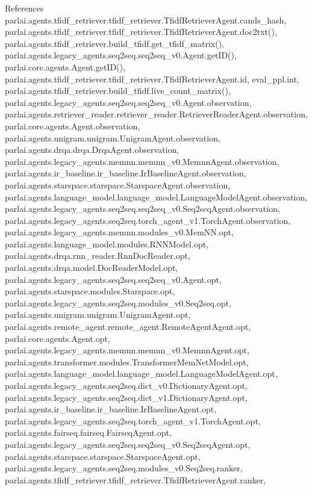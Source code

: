 References parlai.\+agents.\+tfidf\+\_\+retriever.\+tfidf\+\_\+retriever.\+Tfidf\+Retriever\+Agent.\+cands\+\_\+hash, parlai.\+agents.\+tfidf\+\_\+retriever.\+tfidf\+\_\+retriever.\+Tfidf\+Retriever\+Agent.\+doc2txt(), parlai.\+agents.\+tfidf\+\_\+retriever.\+build\+\_\+tfidf.\+get\+\_\+tfidf\+\_\+matrix(), parlai.\+agents.\+legacy\+\_\+agents.\+seq2seq.\+seq2seq\+\_\+v0.\+Agent.\+get\+I\+D(), parlai.\+core.\+agents.\+Agent.\+get\+I\+D(), parlai.\+agents.\+tfidf\+\_\+retriever.\+tfidf\+\_\+retriever.\+Tfidf\+Retriever\+Agent.\+id, eval\+\_\+ppl.\+int, parlai.\+agents.\+tfidf\+\_\+retriever.\+build\+\_\+tfidf.\+live\+\_\+count\+\_\+matrix(), parlai.\+agents.\+legacy\+\_\+agents.\+seq2seq.\+seq2seq\+\_\+v0.\+Agent.\+observation, parlai.\+agents.\+retriever\+\_\+reader.\+retriever\+\_\+reader.\+Retriever\+Reader\+Agent.\+observation, parlai.\+core.\+agents.\+Agent.\+observation, parlai.\+agents.\+unigram.\+unigram.\+Unigram\+Agent.\+observation, parlai.\+agents.\+drqa.\+drqa.\+Drqa\+Agent.\+observation, parlai.\+agents.\+legacy\+\_\+agents.\+memnn.\+memnn\+\_\+v0.\+Memnn\+Agent.\+observation, parlai.\+agents.\+ir\+\_\+baseline.\+ir\+\_\+baseline.\+Ir\+Baseline\+Agent.\+observation, parlai.\+agents.\+starspace.\+starspace.\+Starspace\+Agent.\+observation, parlai.\+agents.\+language\+\_\+model.\+language\+\_\+model.\+Language\+Model\+Agent.\+observation, parlai.\+agents.\+legacy\+\_\+agents.\+seq2seq.\+seq2seq\+\_\+v0.\+Seq2seq\+Agent.\+observation, parlai.\+agents.\+legacy\+\_\+agents.\+seq2seq.\+torch\+\_\+agent\+\_\+v1.\+Torch\+Agent.\+observation, parlai.\+agents.\+legacy\+\_\+agents.\+memnn.\+modules\+\_\+v0.\+Mem\+N\+N.\+opt, parlai.\+agents.\+language\+\_\+model.\+modules.\+R\+N\+N\+Model.\+opt, parlai.\+agents.\+drqa.\+rnn\+\_\+reader.\+Rnn\+Doc\+Reader.\+opt, parlai.\+agents.\+drqa.\+model.\+Doc\+Reader\+Model.\+opt, parlai.\+agents.\+legacy\+\_\+agents.\+seq2seq.\+seq2seq\+\_\+v0.\+Agent.\+opt, parlai.\+agents.\+starspace.\+modules.\+Starspace.\+opt, parlai.\+agents.\+legacy\+\_\+agents.\+seq2seq.\+modules\+\_\+v0.\+Seq2seq.\+opt, parlai.\+agents.\+unigram.\+unigram.\+Unigram\+Agent.\+opt, parlai.\+agents.\+remote\+\_\+agent.\+remote\+\_\+agent.\+Remote\+Agent\+Agent.\+opt, parlai.\+core.\+agents.\+Agent.\+opt, parlai.\+agents.\+legacy\+\_\+agents.\+memnn.\+memnn\+\_\+v0.\+Memnn\+Agent.\+opt, parlai.\+agents.\+transformer.\+modules.\+Transformer\+Mem\+Net\+Model.\+opt, parlai.\+agents.\+language\+\_\+model.\+language\+\_\+model.\+Language\+Model\+Agent.\+opt, parlai.\+agents.\+legacy\+\_\+agents.\+seq2seq.\+dict\+\_\+v0.\+Dictionary\+Agent.\+opt, parlai.\+agents.\+legacy\+\_\+agents.\+seq2seq.\+dict\+\_\+v1.\+Dictionary\+Agent.\+opt, parlai.\+agents.\+ir\+\_\+baseline.\+ir\+\_\+baseline.\+Ir\+Baseline\+Agent.\+opt, parlai.\+agents.\+legacy\+\_\+agents.\+seq2seq.\+torch\+\_\+agent\+\_\+v1.\+Torch\+Agent.\+opt, parlai.\+agents.\+fairseq.\+fairseq.\+Fairseq\+Agent.\+opt, parlai.\+agents.\+legacy\+\_\+agents.\+seq2seq.\+seq2seq\+\_\+v0.\+Seq2seq\+Agent.\+opt, parlai.\+agents.\+starspace.\+starspace.\+Starspace\+Agent.\+opt, parlai.\+agents.\+legacy\+\_\+agents.\+seq2seq.\+modules\+\_\+v0.\+Seq2seq.\+ranker, parlai.\+agents.\+tfidf\+\_\+retriever.\+tfidf\+\_\+retriever.\+Tfidf\+Retriever\+Agent.\+ranker, 